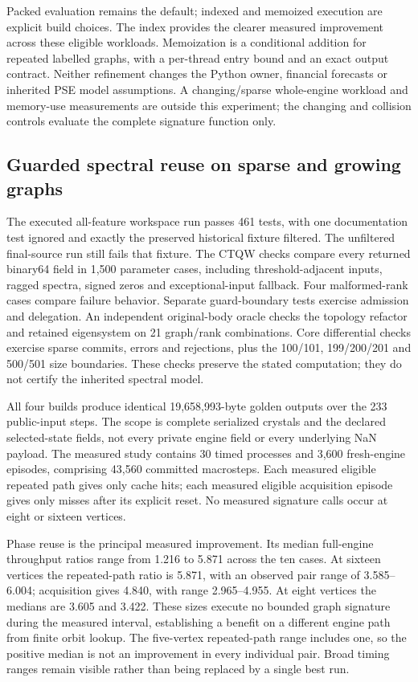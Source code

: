 \documentclass[11pt,a4paper]{article}
\theoremstyle{definition}\newtheorem{definition}[theorem]{Definition}
\begin{document}
Packed evaluation remains the default; indexed and memoized execution are explicit build choices. The index provides the clearer measured improvement across these eligible workloads. Memoization is a conditional addition for repeated labelled graphs, with a per-thread entry bound and an exact output contract. Neither refinement changes the Python owner, financial forecasts or inherited PSE model assumptions. A changing/sparse whole-engine workload and memory-use measurements are outside this experiment; the changing and collision controls evaluate the complete signature function only.


\subsection{Guarded spectral reuse on sparse and growing graphs}\label{sec:spectralphaseresults}
The executed all-feature workspace run passes 461 tests, with one documentation test ignored and exactly the preserved historical fixture filtered. The unfiltered final-source run still fails that fixture. The CTQW checks compare every returned binary64 field in 1,500 parameter cases, including threshold-adjacent inputs, ragged spectra, signed zeros and exceptional-input fallback. Four malformed-rank cases compare failure behavior. Separate guard-boundary tests exercise admission and delegation. An independent original-body oracle checks the topology refactor and retained eigensystem on 21 graph/rank combinations. Core differential checks exercise sparse commits, errors and rejections, plus the 100/101, 199/200/201 and 500/501 size boundaries. These checks preserve the stated computation; they do not certify the inherited spectral model.

All four builds produce identical 19,658,993-byte golden outputs over the 233 public-input steps. The scope is complete serialized crystals and the declared selected-state fields, not every private engine field or every underlying NaN payload. The measured study contains 30 timed processes and 3,600 fresh-engine episodes, comprising 43,560 committed macrosteps. Each measured eligible repeated path gives only cache hits; each measured eligible acquisition episode gives only misses after its explicit reset. No measured signature calls occur at eight or sixteen vertices.



Phase reuse is the principal measured improvement. Its median full-engine throughput ratios range from 1.216 to 5.871 across the ten cases. At sixteen vertices the repeated-path ratio is 5.871, with an observed pair range of 3.585--6.004; acquisition gives 4.840, with range 2.965--4.955. At eight vertices the medians are 3.605 and 3.422. These sizes execute no bounded graph signature during the measured interval, establishing a benefit on a different engine path from finite orbit lookup. The five-vertex repeated-path range includes one, so the positive median is not an improvement in every individual pair. Broad timing ranges remain visible rather than being replaced by a single best run.
\end{document}
